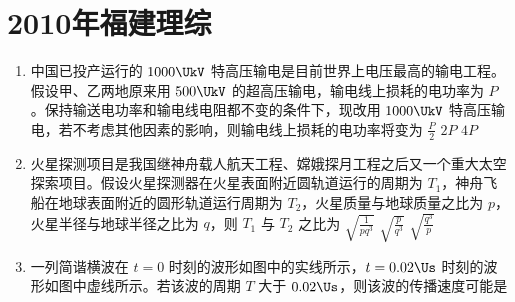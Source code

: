 \documentclass[\gkver]{gaokaozhenti}
\begin{document}
\chapter{2010年福建理综}

\begin{enumerate}
\item
中国已投产运行的 $1000\UkV$ 特高压输电是目前世界上电压最高的输电工程。假设甲、乙两地原来用 $500\UkV$ 的超高压输电，输电线上损耗的电功率为 $P$。保持输送电功率和输电线电阻都不变的条件下，现改用 $1000\UkV$ 特高压输电，若不考虑其他因素的影响，则输电线上损耗的电功率将变为
{$\frac{P}{2}$}
{$2P$}
{$4P$}

\item
火星探测项目是我国继神舟载人航天工程、嫦娥探月工程之后又一个重大太空探索项目。假设火星探测器在火星表面附近圆轨道运行的周期为 $T_{1}$，神舟飞船在地球表面附近的圆形轨道运行周期为 $T_{2}$，火星质量与地球质量之比为 $p$，火星半径与地球半径之比为 $q$，则 $T_{1}$ 与 $T_{2}$ 之比为
{$\sqrt{\frac{1}{pq^{3}}}$}
{$\sqrt{\frac{p}{q^{3}}}$}
{$\sqrt{\frac{q^{3}}{p}}$}

\item
一列简谐横波在 $t=0$ 时刻的波形如图中的实线所示，$t=0.02\Us$ 时刻的波形如图中虚线所示。若该波的周期 $T$ 大于 $0.02\Us$，则该波的传播速度可能是


\end{enumerate}
\end{document}
